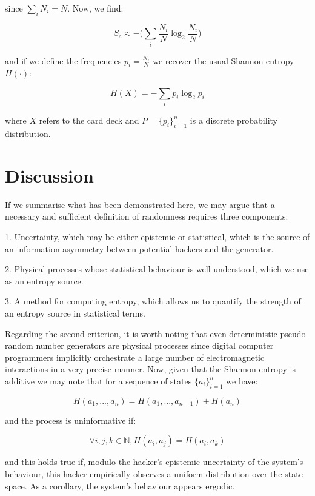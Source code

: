 \documentclass{article}
\begin{document}
since $\sum_i N_i = N$. Now, we find:

\begin{equation}
S_c \approx -\big(\sum_i \frac{N_i}{N} \log_2 \frac{N_i}{N} \big)
\end{equation}

and if we define the frequencies $p_i = \frac{N_i}{N}$ we recover the usual
Shannon entropy $H(\cdot)$:

\begin{equation}
H(X) = - \sum_i p_i \log_2 p_i
\end{equation}

where $X$ refers to the card deck and $P=\{p_i\}_{i=1}^n$ is a discrete probability distribution.

\section{Discussion}

If we summarise what has been demonstrated here, we may argue that a necessary and sufficient definition of randomness requires three components: 

1. Uncertainty, which may be either epistemic or statistical, which is the source of an information asymmetry between potential hackers and the generator. 

2. Physical processes whose statistical behaviour is well-understood, which we use as an entropy source.

3. A method for computing entropy, which allows us to quantify the strength of an entropy source in statistical terms.  

Regarding the second criterion, it is worth noting that even deterministic pseudo-random number generators are physical processes since digital computer programmers implicitly orchestrate a large number of electromagnetic interactions in a very precise manner. Now, given that the Shannon entropy is additive we may note that for a sequence of states $\{a_i\}_{i=1}^n$ we have: 

\begin{equation}
H(a_1,...,a_n)= H(a_1,...,a_{n-1}) + H(a_n)
\end{equation}

and the process is uninformative if: 

\begin{equation}
\forall i,j,k \in \mathbb{N}, H(a_i,a_j) = H(a_i,a_k) 
\end{equation}

and this holds true if, modulo the hacker's epistemic uncertainty of the system's behaviour, this hacker empirically observes a uniform distribution over the state-space. As a corollary, the system's behaviour appears ergodic.  
\end{document}
